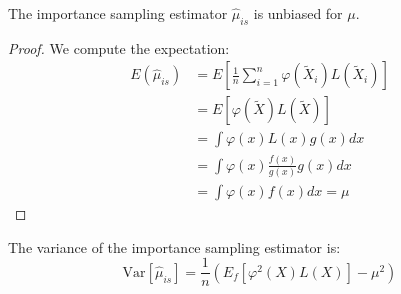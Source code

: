 \begin{theoremrep}
The importance sampling estimator $\hat{\mu}_{is}$ is unbiased for $\mu$.
\end{theoremrep}

\begin{proof}
We compute the expectation:
\begin{align*}
E(\hat{\mu}_{is}) &= E\left[\frac{1}{n}\sum_{i=1}^n \varphi(\tilde{X}_i)L(\tilde{X}_i)\right]\\
&= E[\varphi(\tilde{X})L(\tilde{X})]\\
&= \int \varphi(x)L(x)g(x)dx\\
&= \int \varphi(x)\frac{f(x)}{g(x)}g(x)dx\\
&= \int \varphi(x)f(x)dx = \mu
\end{align*}
\end{proof}

\begin{theoremrep}
The variance of the importance sampling estimator is:
\begin{equation}
\text{Var}[\hat{\mu}_{is}] = \frac{1}{n}\left(E_f[\varphi^2(X)L(X)] - \mu^2\right)
\end{equation}
\end{theoremrep}

